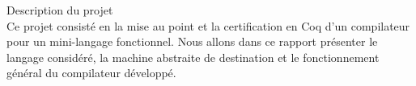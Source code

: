 \documentclass[a4paper,twoside,12pt]{article}
\begin{document}
%

\setcounter{page}{1}

\clearpage

\tableofcontents

\clearpage

\begin{intro}

\begin{paragraph}{Description du projet\vspace{0.2cm}\\}
Ce projet consisté en la mise au point et la certification en Coq d'un compilateur pour un mini-langage fonctionnel. Nous allons dans ce rapport présenter le langage considéré, la machine abstraite de destination et le fonctionnement général du compilateur développé.
\end{paragraph}

\end{intro}
\end{document}
